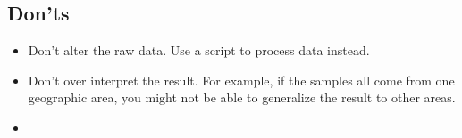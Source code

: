 \documentclass[
]{book}
\providecommand{\tightlist}{%
  \setlength{\itemsep}{0pt}\setlength{\parskip}{0pt}}
\begin{document}
\hypertarget{donts}{%
\subsection{Don'ts}\label{donts}}

\begin{itemize}
\tightlist
\item
  Don't alter the raw data. Use a script to process data instead.
\item
  Don't over interpret the result. For example, if the samples all come from one geographic area, you might not be able to generalize the result to other areas.\\
\item
\end{itemize}

  
\end{document}
